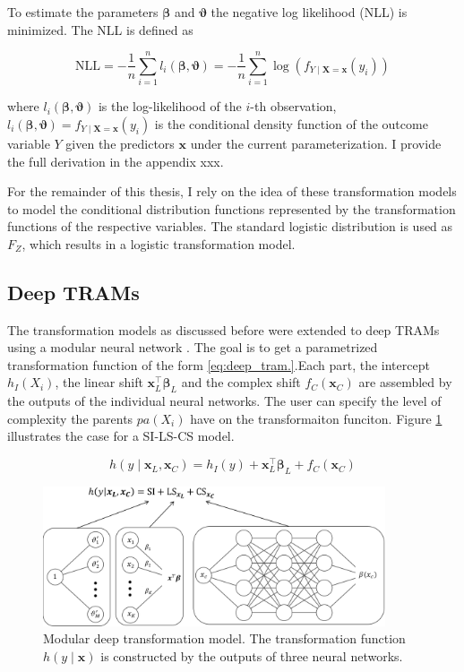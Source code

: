 To estimate the parameters $\boldsymbol{\beta}$ and $\boldsymbol{\vartheta}$ the negative log likelihood (NLL) is minimized. The NLL is defined as

\begin{equation}
\text{NLL} = - \frac{1}{n} \sum_{i=1}^{n} l_i(\boldsymbol{\beta}, \boldsymbol{\vartheta} ) = - \frac{1}{n} \sum_{i=1}^{n} \log (f_{Y \mid \mathbf{X} = \mathbf{x}}(y_i))
\label{eq:nll_tram}
\end{equation}

where $l_i(\boldsymbol{\beta}, \boldsymbol{\vartheta})$ is the log-likelihood of the $i$-th observation,  $l_i(\boldsymbol{\beta}, \boldsymbol{\vartheta}) = f_{Y \mid \mathbf{X} = \mathbf{x}}(y_i)$ is the conditional density function of the outcome variable $Y$ given the predictors $\mathbf{x}$ under the current parameterization. I provide the full derivation in the appendix xxx.


For the remainder of this thesis, I rely on the idea of these transformation models to model the conditional distribution functions represented by the transformation functions of the respective variables. The standard logistic distribution is used as $F_Z$, which results in a logistic transformation model.


\subsection{Deep TRAMs} \label{sec:deep_trams}

The transformation models as discussed before were extended to deep TRAMs using a modular neural network \citep{sick2020}. The goal is to get a parametrized transformation function of the form \ref{eq:deep_tram.}.Each part, the intercept $h_I(X_i)$, the linear shift $\mathbf{x}_L^\top \boldsymbol{\beta}_L$ and the complex shift $f_C(\mathbf{x}_C)$ are assembled by the outputs of the individual neural networks. The user can specify the level of complexity the parents $pa(X_i)$ have on the transformaiton funciton. Figure \ref{fig:deep_tram} illustrates the case for a SI-LS-CS model.

\begin{equation}
h(y \mid \mathbf{x}_L, \mathbf{x}_C ) = h_I(y) + \mathbf{x}_L^\top \boldsymbol{\beta}_L + f_C(\mathbf{x}_C)
\label{eq:deep_tram}
\end{equation}



\begin{figure}[H]
\centering
\includegraphics[width=0.9\textwidth]{img/deep_tram.png}
\caption{Modular deep transformation model. The transformation function $h(y \mid \mathbf{x})$ is constructed by the outputs of three neural networks.}
\label{fig:deep_tram}
\end{figure}


